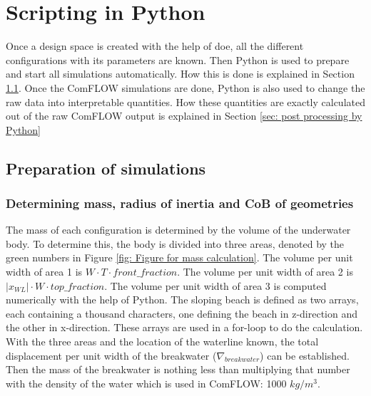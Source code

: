 \section{Scripting in Python}
Once a design space is created with the help of \acrshort{doe}, all the different configurations with its parameters are known. Then Python is used to prepare and start all simulations automatically. How this is done is explained in Section \ref{sec: preperation of simulations by Python}. Once the ComFLOW simulations are done, Python is also used to change the raw data into interpretable quantities. How these quantities are exactly calculated out of the raw ComFLOW output is explained in Section \ref{sec: post processing by Python}

\subsection{Preparation of simulations}
\label{sec: preperation of simulations by Python}
\subsubsection{Determining mass, radius of inertia and CoB of geometries}

The mass of each configuration is determined by the volume of the underwater body. To determine this, the body is divided into three areas, denoted by the green numbers in Figure \ref{fig: Figure for mass calculation}. The volume per unit width of area 1 is $W\cdot T\cdot front\_fraction$. The volume per unit width of area 2 is $|x_{WL}|\cdot W\cdot top\_fraction$. The volume per unit width of area 3 is computed numerically with the help of Python. The sloping beach is defined as two arrays, each containing a thousand characters, one defining the beach in z-direction and the other in x-direction. These arrays are used in a for-loop to do the calculation. With the three areas and the location of the waterline known, the total displacement per unit width of the breakwater ($\nabla_{breakwater}$) can be established. Then the mass of the breakwater is nothing less than multiplying that number with the density of the water which is used in ComFLOW: 1000 $kg/m^3$. 


